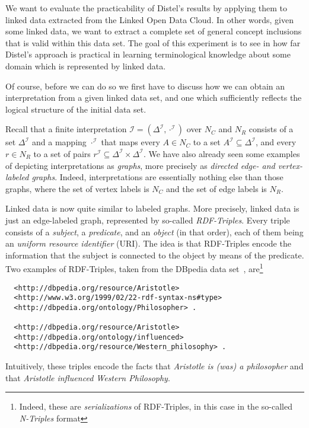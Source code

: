 We want to evaluate the practicability of Distel's results by applying them to linked data
extracted from the Linked Open Data Cloud.  In other words, given some linked data, we
want to extract a complete set of general concept inclusions that is valid within this
data set.  The goal of this experiment is to see in how far Distel's approach is practical
in learning terminological knowledge about some domain which is represented by linked data.

Of course, before we can do so we first have to discuss how we can obtain an
interpretation from a given linked data set, and one which sufficiently reflects the
logical structure of the initial data set.

Recall that a finite interpretation $\mathcal{I} = (\Delta^{\mathcal{I}},
\cdot^{\mathcal{I}})$ over $N_C$ and $N_R$ consists of a set $\Delta^{\mathcal{I}}$ and a
mapping $\cdot^{\mathcal{I}}$ that maps every $A \in N_C$ to a set $A^{\mathcal{I}}
\subseteq \Delta^{\mathcal{I}}$, and every $r \in N_R$ to a set of pairs $r^{\mathcal{I}}
\subseteq \Delta^{\mathcal{I}} \times \Delta^{\mathcal{I}}$.  We have also already seen
some examples of depicting interpretations as \emph{graphs}, more precisely as
\emph{directed edge- and vertex-labeled graphs}.  Indeed, interpretations are essentially
nothing else than those graphs, where the set of vertex labels is $N_C$ and the set of
edge labels is $N_R$.

Linked data is now quite similar to labeled graphs.  More precisely, linked data is just
an edge-labeled graph, represented by so-called \emph{RDF-Triples}.  Every triple consists
of a \emph{subject}, a \emph{predicate}, and an \emph{object} (in that order), each of
them being an \emph{uniform resource identifier} (URI).  The idea is that RDF-Triples
encode the information that the subject is connected to the object by means of the
predicate.  Two examples of RDF-Triples, taken from the DBpedia data set~\cite{DBpedia},
are\footnote{Indeed, these are \emph{serializations} of RDF-Triples, in this case in the
  so-called \emph{N-Triples} format}
\begin{verbatim}
  <http://dbpedia.org/resource/Aristotle>
  <http://www.w3.org/1999/02/22-rdf-syntax-ns#type>
  <http://dbpedia.org/ontology/Philosopher> .

  <http://dbpedia.org/resource/Aristotle>
  <http://dbpedia.org/ontology/influenced>
  <http://dbpedia.org/resource/Western_philosophy> .
\end{verbatim}
Intuitively, these triples encode the facts that \emph{Aristotle is (was) a philosopher}
and that \emph{Aristotle influenced Western Philosophy}.

